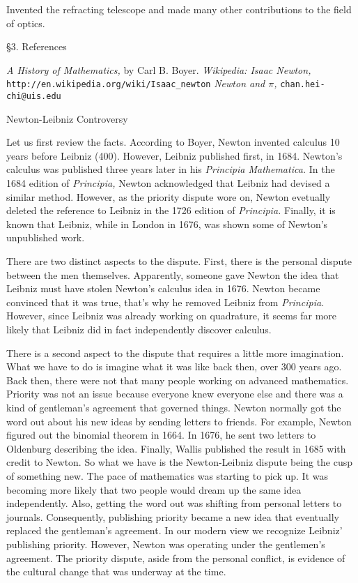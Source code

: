 Invented the refracting telescope and made many other
contributions to the field of optics.



\item{\S3.} References

 {\it A History of Mathematics,} by Carl B. Boyer.
 {\it Wikipedia: Isaac Newton,} {\tt http://en.wikipedia.org/wiki/Isaac\_newton}
 {\it Newton and $\pi$,} {\tt chan.hei-chi@uis.edu}

\vfill
\eject

\beginsection Newton-Leibniz Controversy

Let us first review the facts.
According to Boyer, Newton invented calculus 10 years before Leibniz (400).
However, Leibniz published first, in 1684.
Newton's calculus was published three years later in his
{\it Principia Mathematica.}
In the 1684 edition of {\it Principia,} Newton acknowledged that Leibniz
had devised a similar method.
However, as the priority dispute wore on, Newton evetually deleted the
reference to Leibniz in the 1726 edition of {\it Principia.}
Finally, it is known that Leibniz, while in London in 1676, was shown
some of Newton's unpublished work.

There are two distinct aspects to the dispute.
First, there is the personal dispute between the
men themselves.
Apparently, someone gave Newton the idea that Leibniz
must have stolen Newton's calculus idea in 1676.
Newton became convinced that it was true, that's why he
removed Leibniz from {\it Principia.}
However, since Leibniz was already working on quadrature,
it seems far more likely that Leibniz did in fact
independently discover calculus.

There is a second aspect to the dispute that requires a
little more imagination.
What we have to do is imagine what it was like back then,
over 300 years ago.
Back then, there were not that many people working on advanced
mathematics.
Priority was not an issue because everyone knew everyone else
and there was a kind of gentleman's agreement that governed things.
Newton normally got the word out about his new ideas by sending letters to friends.
For example, Newton figured out the binomial theorem in 1664.
In 1676, he sent two letters to Oldenburg describing the idea.
Finally, Wallis published the result in 1685 with credit to Newton.
So what we have is the Newton-Leibniz dispute being the cusp of
something new.
The pace of mathematics was starting to pick up.
It was becoming more likely that two people would dream up
the same idea independently.
Also, getting the word out was shifting from personal letters
to journals.
Consequently, publishing priority became a new idea that eventually replaced
the gentleman's agreement.
In our modern view we recognize Leibniz' publishing priority.
However, Newton was operating under the gentlemen's agreement.
The priority dispute, aside from the personal conflict, is evidence
of the cultural change that was underway at the time. 

